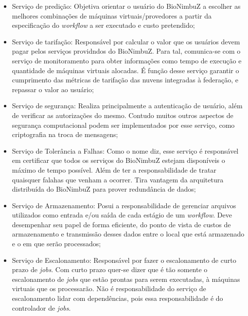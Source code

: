 	\begin{itemize}
		\item Serviço de predição: Objetiva orientar o usuário do BioNimbuZ a escolher as melhores combinações de máquinas virtuais/provedores a partir da especificação do \textit{workflow} a ser executado e custo pretendido;
		\item Serviço de tarifação: Responsável por calcular o valor que os usuários devem pagar pelos serviços providndos do BioNimbuZ. Para tal, comunica-se com o serviço de monitoramento para obter informações como tempo de execução e quantidade de máquinas virtuais alocadas. É função desse serviço garantir o cumprimento das métricas de tarifação das nuvens integradas à federação, e repassar o valor ao usuário;
		\item Serviço de segurança: Realiza principalmente a autenticação de usuário, além de verificar as autorizações do mesmo. Contudo muitos outros aspectos de segurança computacional podem ser implementados por esse serviço, como criptografia na troca de mensagens;
		\item Serviço de Tolerância a Falhas: Como o nome diz, esse serviço é responsável em certificar que todos os serviços do BioNimbuZ estejam disponíveis o máximo de tempo possível. Além de ter a responsabilidade de tratar quaisquer falahas que venham a ocorrer. Tira vantagem da arquitetura distribuída do BioNimbuZ para prover redundância de dados;
		\item Serviço de Armazenamento: Posui a responsabilidade de gerenciar arquivos utilizados como entrada e/ou saída de cada estágio de um \textit{workflow}. Deve desempenhar seu papel de forma eficiente, do ponto de vista de custos de armazenamento e transmissão desses dados entre o local que está armazenado e o em que serão processados;
		\item Serviço de Escalonamento: Responsável por fazer o escalonamento de curto prazo de \textit{jobs}. Com curto prazo quer-se dizer que é tão somente o escalonamento de \textit{jobs} que estão prontas para serem executadas, à máquinas virtuais que os processarão. Não é responsabilidade do serviço de escalonamento lidar com dependências, pois essa responsabilidade é do controlador de \textit{jobs}.
	

\end{itemize}
